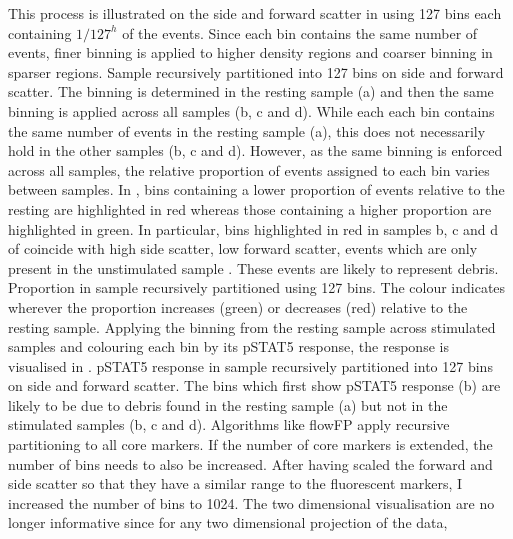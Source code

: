 This process is illustrated on the side and forward scatter in  using 127 bins
each containing  $1/127^{h}$ of the events. Since each bin contains the same number of events, finer binning is applied
to higher density regions and coarser binning in sparser regions.
%
{Sample recursively partitioned into 127 bins on side and forward scatter.}
{
   The binning is determined in the resting sample (a) and then the same binning is applied across all samples (b, c and d).
   While each each bin contains the same number of events in the resting sample (a), this does not necessarily hold in the
   other samples (b, c and d).
}
%
However, as the same binning is enforced across all samples, the relative proportion of events assigned to each bin varies between samples.
In , bins containing a lower proportion of events relative to the resting are highlighted in red
whereas those containing a higher proportion are highlighted in green.
In particular, bins highlighted in red in samples b, c and d of 
coincide with high side scatter, low forward scatter, events which are only present in the unstimulated sample
.  These events are likely to represent debris.
%
{Proportion in sample recursively partitioned using 127 bins.}
{The colour indicates wherever the proportion increases (green) or decreases (red) relative to the resting sample.}
%
Applying the binning from the resting sample across stimulated samples and colouring each bin by its pSTAT5 response, the
response is visualised in .
%
{pSTAT5 response in sample recursively partitioned into 127 bins on side and forward scatter.}
{
    The bins which first show  pSTAT5 response (b) are likely to be due to debris found in the resting sample (a)
    but not in the stimulated samples (b, c and d).
}
% 
Algorithms like flowFP apply recursive partitioning to all core markers.
If the number of core markers is extended, the number of bins needs to also be increased.
After having scaled the forward and side scatter so that they have a similar range to the fluorescent markers,
I increased the number of bins to 1024.
The two dimensional visualisation are no longer informative since for any two dimensional projection of the data,

